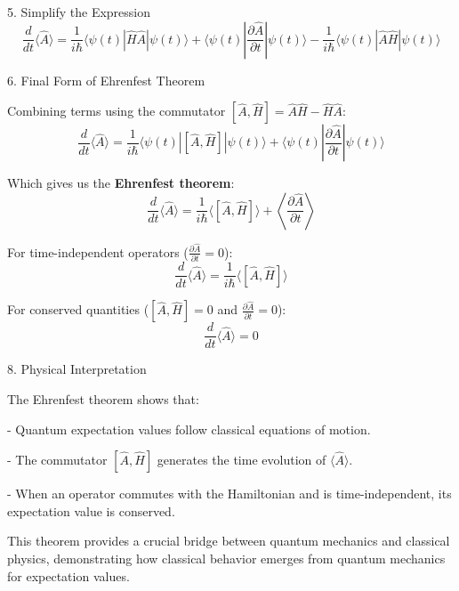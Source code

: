 5. Simplify the Expression
\begin{equation}
	\frac{d}{dt}\langle\hat{A}\rangle = \frac{1}{i\hbar}\langle\psi(t)|\hat{H}\hat{A}|\psi(t)\rangle + \langle\psi(t)|\frac{\partial\hat{A}}{\partial t}|\psi(t)\rangle - \frac{1}{i\hbar}\langle\psi(t)|\hat{A}\hat{H}|\psi(t)\rangle
\end{equation}

6. Final Form of Ehrenfest Theorem

Combining terms using the commutator $[\hat{A},\hat{H}] = \hat{A}\hat{H} - \hat{H}\hat{A}$:
\begin{equation}
	\frac{d}{dt}\langle\hat{A}\rangle = \frac{1}{i\hbar}\langle\psi(t)|[\hat{A},\hat{H}]|\psi(t)\rangle + \langle\psi(t)|\frac{\partial\hat{A}}{\partial t}|\psi(t)\rangle
\end{equation}

Which gives us the \textbf{Ehrenfest theorem}:
\begin{equation}\label{E-F-T}
	\boxed{
		\frac{d}{dt}\langle\hat{A}\rangle = \frac{1}{i\hbar}\langle[\hat{A},\hat{H}]\rangle + 
		\left\langle\frac{\partial\hat{A}}{\partial t}\right\rangle
	}
\end{equation}

For time-independent operators ($\frac{\partial\hat{A}}{\partial t} = 0$):
\begin{equation}
	\frac{d}{dt}\langle\hat{A}\rangle = \frac{1}{i\hbar}\langle[\hat{A},\hat{H}]\rangle
\end{equation}

For conserved quantities ($[\hat{A},\hat{H}] = 0$ and $\frac{\partial\hat{A}}{\partial t} = 0$):
\begin{equation}
	\frac{d}{dt}\langle\hat{A}\rangle = 0
\end{equation}

8. Physical Interpretation

The Ehrenfest theorem shows that:

- Quantum expectation values follow classical equations of motion.

- The commutator $[\hat{A},\hat{H}]$ generates the time evolution of $\langle\hat{A}\rangle$.

- When an operator commutes with the Hamiltonian and is time-independent, its expectation value is conserved.

This theorem provides a crucial bridge between quantum mechanics and classical physics, demonstrating how classical behavior emerges from quantum mechanics for expectation values.

